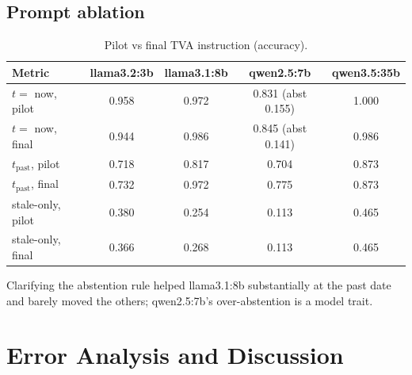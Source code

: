 \documentclass[11pt,a4paper]{report}
\begin{document}
\section{Prompt ablation}\label{sec:promptabl}
\begin{table}[htbp]\centering\caption{Pilot vs final TVA instruction (accuracy).}\small
\begin{tabular}{l c c c c}\toprule\rowcolor{cIngest}\textbf{Metric}&\textbf{llama3.2:3b}&\textbf{llama3.1:8b}&\textbf{qwen2.5:7b}&\textbf{qwen3.5:35b}\\\midrule
$t=$ now, pilot & 0.958 & 0.972 & 0.831 (abst 0.155) & 1.000\\
$t=$ now, final & 0.944 & 0.986 & 0.845 (abst 0.141) & 0.986\\
$t_{\text{past}}$, pilot & 0.718 & 0.817 & 0.704 & 0.873\\
$t_{\text{past}}$, final & 0.732 & 0.972 & 0.775 & 0.873\\
stale-only, pilot & 0.380 & 0.254 & 0.113 & 0.465\\
stale-only, final & 0.366 & 0.268 & 0.113 & 0.465\\\bottomrule\end{tabular}\end{table}
Clarifying the abstention rule helped llama3.1:8b substantially at the past date and barely moved the others; qwen2.5:7b's over-abstention is a model trait.

\chapter{Error Analysis and Discussion}
\end{document}
